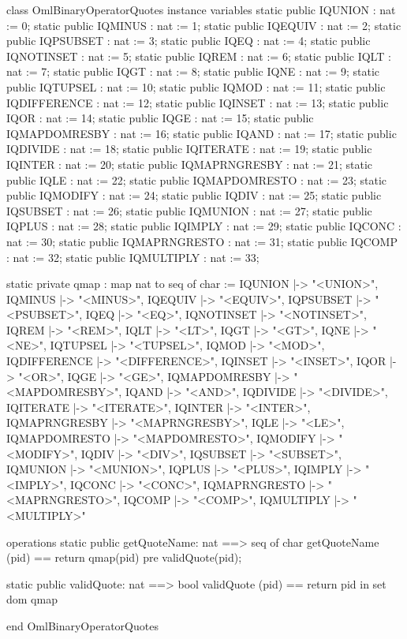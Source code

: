 \begin{vdm_al}
class OmlBinaryOperatorQuotes
instance variables
  static public IQUNION : nat := 0;
  static public IQMINUS : nat := 1;
  static public IQEQUIV : nat := 2;
  static public IQPSUBSET : nat := 3;
  static public IQEQ : nat := 4;
  static public IQNOTINSET : nat := 5;
  static public IQREM : nat := 6;
  static public IQLT : nat := 7;
  static public IQGT : nat := 8;
  static public IQNE : nat := 9;
  static public IQTUPSEL : nat := 10;
  static public IQMOD : nat := 11;
  static public IQDIFFERENCE : nat := 12;
  static public IQINSET : nat := 13;
  static public IQOR : nat := 14;
  static public IQGE : nat := 15;
  static public IQMAPDOMRESBY : nat := 16;
  static public IQAND : nat := 17;
  static public IQDIVIDE : nat := 18;
  static public IQITERATE : nat := 19;
  static public IQINTER : nat := 20;
  static public IQMAPRNGRESBY : nat := 21;
  static public IQLE : nat := 22;
  static public IQMAPDOMRESTO : nat := 23;
  static public IQMODIFY : nat := 24;
  static public IQDIV : nat := 25;
  static public IQSUBSET : nat := 26;
  static public IQMUNION : nat := 27;
  static public IQPLUS : nat := 28;
  static public IQIMPLY : nat := 29;
  static public IQCONC : nat := 30;
  static public IQMAPRNGRESTO : nat := 31;
  static public IQCOMP : nat := 32;
  static public IQMULTIPLY : nat := 33;

  static private qmap : map nat to seq of char :=
    { IQUNION |-> "<UNION>",
      IQMINUS |-> "<MINUS>",
      IQEQUIV |-> "<EQUIV>",
      IQPSUBSET |-> "<PSUBSET>",
      IQEQ |-> "<EQ>",
      IQNOTINSET |-> "<NOTINSET>",
      IQREM |-> "<REM>",
      IQLT |-> "<LT>",
      IQGT |-> "<GT>",
      IQNE |-> "<NE>",
      IQTUPSEL |-> "<TUPSEL>",
      IQMOD |-> "<MOD>",
      IQDIFFERENCE |-> "<DIFFERENCE>",
      IQINSET |-> "<INSET>",
      IQOR |-> "<OR>",
      IQGE |-> "<GE>",
      IQMAPDOMRESBY |-> "<MAPDOMRESBY>",
      IQAND |-> "<AND>",
      IQDIVIDE |-> "<DIVIDE>",
      IQITERATE |-> "<ITERATE>",
      IQINTER |-> "<INTER>",
      IQMAPRNGRESBY |-> "<MAPRNGRESBY>",
      IQLE |-> "<LE>",
      IQMAPDOMRESTO |-> "<MAPDOMRESTO>",
      IQMODIFY |-> "<MODIFY>",
      IQDIV |-> "<DIV>",
      IQSUBSET |-> "<SUBSET>",
      IQMUNION |-> "<MUNION>",
      IQPLUS |-> "<PLUS>",
      IQIMPLY |-> "<IMPLY>",
      IQCONC |-> "<CONC>",
      IQMAPRNGRESTO |-> "<MAPRNGRESTO>",
      IQCOMP |-> "<COMP>",
      IQMULTIPLY |-> "<MULTIPLY>" }

operations
  static public getQuoteName: nat ==> seq of char
  getQuoteName (pid) ==
    return qmap(pid)
    pre validQuote(pid);

  static public validQuote: nat ==> bool
  validQuote (pid) == return pid in set dom qmap

end OmlBinaryOperatorQuotes
\end{vdm_al}
